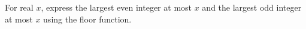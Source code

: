 For real $x$, express the largest even integer at most $x$ and the largest odd integer at most $x$ using the floor function.
